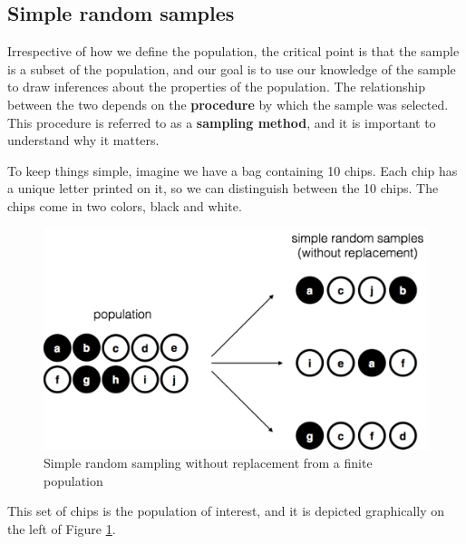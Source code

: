 \documentclass[]{book}
\begin{document}
\hypertarget{simple-random-samples}{%
\subsection{Simple random samples}\label{simple-random-samples}}

Irrespective of how we define the population, the critical point is that the sample is a subset of the population, and our goal is to use our knowledge of the sample to draw inferences about the properties of the population. The relationship between the two depends on the \textbf{procedure} by which the sample was selected. This procedure is referred to as a \textbf{sampling method}, and it is important to understand why it matters.

To keep things simple, imagine we have a bag containing 10 chips. Each chip has a unique letter printed on it, so we can distinguish between the 10 chips. The chips come in two colors, black and white.

\begin{figure}
\centering
\includegraphics{navarro_img/estimation/srs1.pdf}
\caption{\label{fig:srs1}Simple random sampling without replacement from a finite population}
\end{figure}

This set of chips is the population of interest, and it is depicted graphically on the left of Figure \ref{fig:srs1}.
\end{document}
